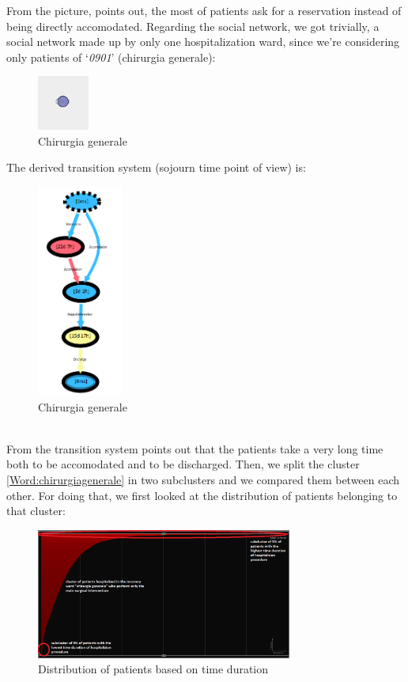\newline
From the picture, points out, the most of patients ask for a reservation instead of being directly accomodated. Regarding the social network, we got trivially, a social network made up by only one hospitalization ward, since we're considering only patients of `\textit{0901}' (chirurgia generale): 
\begin{figure} [htbp]
\includegraphics[width=0.15\textwidth , keepaspectratio]{RicoveriSocialNetwork0901}
\caption{Chirurgia generale}
\end{figure}
\clearpage
\noindent
The derived transition system (sojourn time point of view) is:
\begin{figure} [htbp]
\includegraphics[width=0.25\textwidth , keepaspectratio]{RicoveriTransitionSystemSojourn0901}
\caption{Chirurgia generale}
\end{figure}\\
From the transition system points out that the patients take a very long time both to be accomodated and to be discharged. Then, we split the cluster \ref{Word:chirurgiagenerale} in two subclusters and we compared them between each other. For doing that, we first looked at the distribution of patients belonging to that cluster:
\begin{figure} [htbp]
\includegraphics[width=0.75\textwidth , keepaspectratio]{RicoveriChart}
\caption{Distribution of patients based on time duration}
\end{figure}\\
